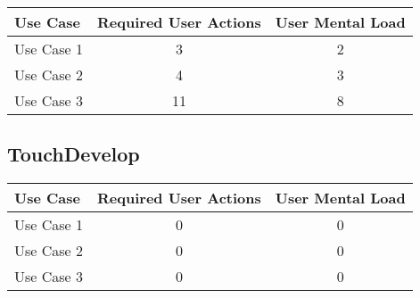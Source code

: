 


\begin{tabularx}{\textwidth}{Xcc}
\textbf{Use Case} & \textbf{Required User Actions} & \textbf{User Mental Load}\\
\hline
Use Case 1                          & 3 & 2 \\
Use Case 2                          & 4 & 3 \\
Use Case 3                          & 11 & 8
\end{tabularx}

\subsection{TouchDevelop}




\begin{tabularx}{\textwidth}{Xcc}
\textbf{Use Case} & \textbf{Required User Actions} & \textbf{User Mental Load}\\
\hline
Use Case 1                          & 0 & 0 \\
Use Case 2                          & 0 & 0 \\
Use Case 3                          & 0 & 0
\end{tabularx}

